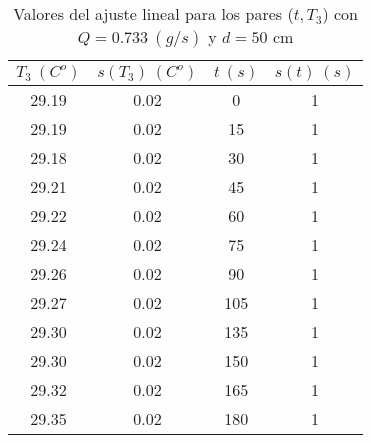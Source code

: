 \documentclass[12pt,a4paper]{article}
\begin{document}
 \begin{table}[h!] 	 \centering 
\begin{tabular}{|c|c|c|c|} 
\hline 
$T_3 \ (C^o)$ & $s(T_3) \ (C^o)$ & $ t \ (s)$ & $s(t) \ (s)$  \\ \hline 
29.19  & 0.02 &  0 & 1 \\ 
\hline
29.19  & 0.02 &  15 & 1 \\ 
\hline
29.18  & 0.02 &  30 & 1 \\ 
\hline
29.21  & 0.02 &  45 & 1 \\ 
\hline
29.22  & 0.02 &  60 & 1 \\ 
\hline
29.24  & 0.02 &  75 & 1 \\ 
\hline
29.26  & 0.02 &  90 & 1 \\ 
\hline
29.27  & 0.02 &  105 & 1 \\ 
\hline
29.30  & 0.02 &  135 & 1 \\ 
\hline
29.30  & 0.02 &  150 & 1 \\ 
\hline
29.32  & 0.02 &  165 & 1 \\ 
\hline
29.35  & 0.02 &  180 & 1 \\ 
\hline
\end{tabular} 
\caption{Valores del ajuste lineal para los pares ($t,T_3$) con $Q=0.733 \ (g/s)$ y $d= 50 $ cm} 
\label{tab:datoscrudos9} 
\end{table} 
 
 
\end{document}
